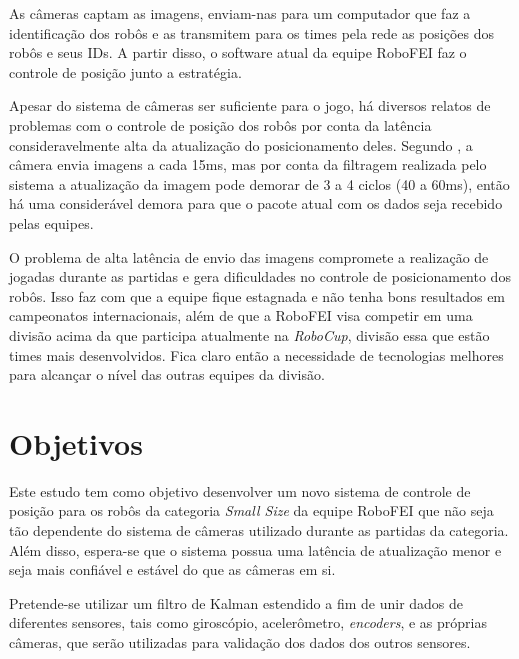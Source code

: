 \documentclass[acronym, symbols]{fei}
\begin{document}

	As câmeras captam as imagens, enviam-nas para um computador que faz a identificação dos robôs e as transmitem para os times pela rede as posições dos robôs e seus IDs. A partir disso, o software atual da equipe RoboFEI faz o controle de posição junto a estratégia. 
	
	Apesar do sistema de câmeras ser suficiente para o jogo, há diversos relatos de problemas com o controle de posição dos robôs por conta da latência consideravelmente alta da atualização do posicionamento deles. Segundo \textcite{tdpZJUNlict2020}, a câmera envia imagens a cada 15ms, mas por conta da filtragem realizada pelo sistema a atualização da imagem pode demorar de 3 a 4 ciclos (40 a 60ms), então há uma considerável demora para que o pacote atual com os dados seja recebido pelas equipes.
	
	O problema de alta latência de envio das imagens compromete a realização de jogadas durante as partidas e gera dificuldades no controle de posicionamento dos robôs. Isso faz com que a equipe fique estagnada e não tenha bons resultados em campeonatos internacionais, além de que a RoboFEI visa competir em uma divisão acima da que participa atualmente na \textit{RoboCup}, divisão essa que estão times mais desenvolvidos. Fica claro então a necessidade de tecnologias melhores para alcançar o nível das outras equipes da divisão.
	
	\section{Objetivos}
	
		Este estudo tem como objetivo desenvolver um novo sistema de controle de posição para os robôs da categoria \textit{Small Size} da equipe RoboFEI que não seja tão dependente do sistema de câmeras utilizado durante as partidas da categoria. Além disso, espera-se que o sistema possua uma latência de atualização menor e seja mais confiável e estável do que as câmeras em si. 
		
		Pretende-se utilizar um filtro de Kalman estendido a fim de unir dados de diferentes sensores, tais como giroscópio, acelerômetro, \textit{encoders}, e as próprias câmeras, que serão utilizadas para validação dos dados dos outros sensores.
		
\end{document}
